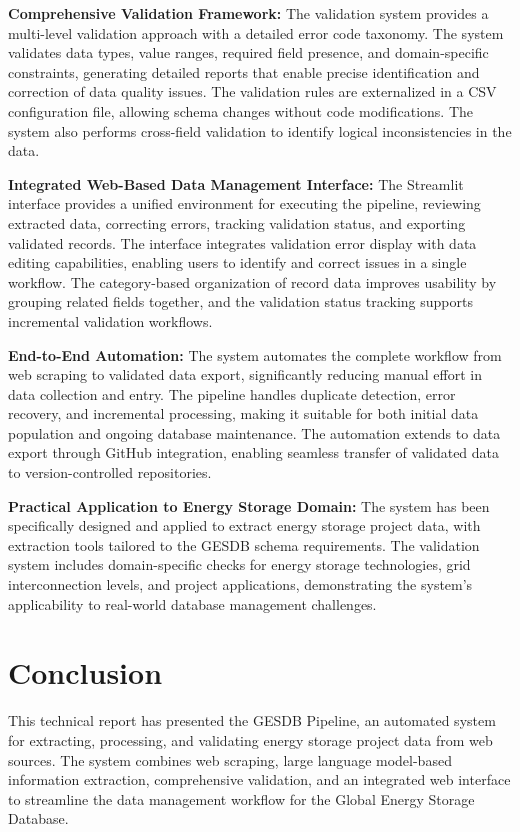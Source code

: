 \documentclass[11pt]{article}
\begin{document}
\textbf{Comprehensive Validation Framework:} The validation system provides a multi-level validation approach with a detailed error code taxonomy. The system validates data types, value ranges, required field presence, and domain-specific constraints, generating detailed reports that enable precise identification and correction of data quality issues. The validation rules are externalized in a CSV configuration file, allowing schema changes without code modifications. The system also performs cross-field validation to identify logical inconsistencies in the data.

\textbf{Integrated Web-Based Data Management Interface:} The Streamlit interface provides a unified environment for executing the pipeline, reviewing extracted data, correcting errors, tracking validation status, and exporting validated records. The interface integrates validation error display with data editing capabilities, enabling users to identify and correct issues in a single workflow. The category-based organization of record data improves usability by grouping related fields together, and the validation status tracking supports incremental validation workflows.

\textbf{End-to-End Automation:} The system automates the complete workflow from web scraping to validated data export, significantly reducing manual effort in data collection and entry. The pipeline handles duplicate detection, error recovery, and incremental processing, making it suitable for both initial data population and ongoing database maintenance. The automation extends to data export through GitHub integration, enabling seamless transfer of validated data to version-controlled repositories.

\textbf{Practical Application to Energy Storage Domain:} The system has been specifically designed and applied to extract energy storage project data, with extraction tools tailored to the GESDB schema requirements. The validation system includes domain-specific checks for energy storage technologies, grid interconnection levels, and project applications, demonstrating the system's applicability to real-world database management challenges.

\section{Conclusion}
\label{sec:conclusion}

This technical report has presented the GESDB Pipeline, an automated system for extracting, processing, and validating energy storage project data from web sources. The system combines web scraping, large language model-based information extraction, comprehensive validation, and an integrated web interface to streamline the data management workflow for the Global Energy Storage Database.
\end{document}
